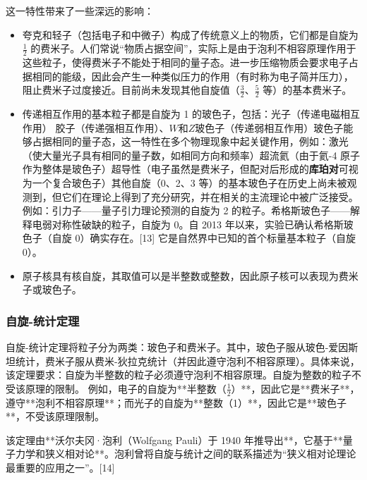 这一特性带来了一些深远的影响： 
\begin{itemize}
\item 夸克和轻子（包括电子和中微子）构成了传统意义上的物质，它们都是自旋为 \( \frac{1}{2} \) 的费米子。人们常说“物质占据空间”，实际上是由于泡利不相容原理作用于这些粒子，使得费米子不能处于相同的量子态。进一步压缩物质会要求电子占据相同的能级，因此会产生一种类似压力的作用（有时称为电子简并压力），阻止费米子过度接近。目前尚未发现其他自旋值（\( \frac{3}{2} \)、\( \frac{5}{2} \) 等）的基本费米子。  
\item 传递相互作用的基本粒子都是自旋为 1 的玻色子，包括：光子（传递电磁相互作用） 胶子（传递强相互作用）、\(W\)和\(Z\)玻色子（传递弱相互作用）玻色子能够占据相同的量子态，这一特性在多个物理现象中起关键作用，例如：激光（使大量光子具有相同的量子数，如相同方向和频率）超流氦（由于氦-4 原子作为整体是玻色子）超导性（电子虽然是费米子，但配对后形成的\textbf{库珀对}可视为一个复合玻色子）其他自旋（0、2、3 等）的基本玻色子在历史上尚未被观测到，但它们在理论上得到了充分研究，并在相关的主流理论中被广泛接受。例如：引力子——量子引力理论预测的自旋为 2 的粒子。希格斯玻色子——解释电弱对称性破缺的粒子，自旋为 0。自 2013 年以来，实验已确认希格斯玻色子（自旋 0）确实存在。[13] 它是自然界中已知的首个标量基本粒子（自旋 0）。  
\item 原子核具有核自旋，其取值可以是半整数或整数，因此原子核可以表现为费米子或玻色子。
\end{itemize}
\subsubsection{自旋-统计定理}  
自旋-统计定理将粒子分为两类：玻色子和费米子。其中，玻色子服从玻色-爱因斯坦统计，费米子服从费米-狄拉克统计（并因此遵守泡利不相容原理）。具体来说，该定理要求：自旋为半整数的粒子必须遵守泡利不相容原理。自旋为整数的粒子不受该原理的限制。  例如，电子的自旋为**半整数（\( \frac{1}{2} \)）**，因此它是**费米子**，遵守**泡利不相容原理**；而光子的自旋为**整数（1）**，因此它是**玻色子**，不受该原理限制。  

该定理由**沃尔夫冈·泡利（Wolfgang Pauli）于 1940 年推导出**，它基于**量子力学和狭义相对论**。泡利曾将自旋与统计之间的联系描述为“狭义相对论理论最重要的应用之一”。[14]